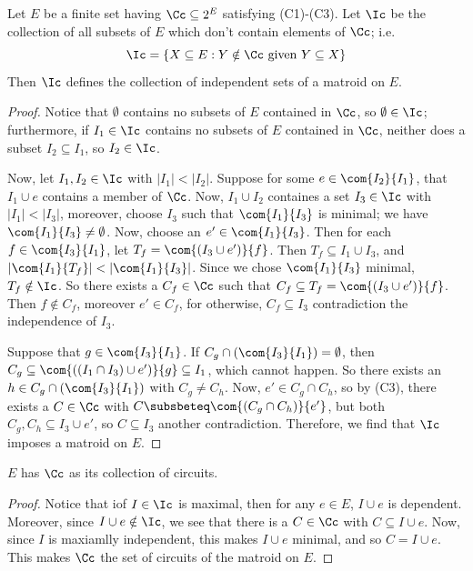 \begin{theorem}\label{1.1.2}
    Let $E$ be a finite set having  $\Cc \subseteq 2^E$ satisfying (C1)-(C3).
    Let $\Ic$ be the collection of all subsets of $E$ which don't contain
    elements of  $\Cc$; i.e.
    \begin{equation*}
        \Ic=\{X \subseteq E : Y \notin \Cc \text{ given } Y \subseteq X\}
    \end{equation*}
    Then $\Ic$ defines the collection of independent sets of a matroid on $E$.
\end{theorem}
\begin{proof}
    Notice that $\emptyset$ contains no subsets of  $E$ contained in  $\Cc$, so
     $\emptyset \in \Ic$; furthermore, if  $I_1 \in \Ic$ contains no subsets of
     $E$ contained in  $\Cc$, neither does a subset  $I_2 \subseteq I_1$, so
     $I_2 \in \Ic$.

     Now, let $I_1,I_2 \in \Ic$ with $|I_1|<|I_2|$. Suppose for some $e \in
     \com{I_2}{I_1}$, that $I_1 \cup e$ contains a member of $\Cc$. Now,  $I_1
     \cup I_2$ containes a set $I_3 \in \Ic$ with $|I_1|<|I_3|$, moreover,
     choose $I_3$ such that $\com{I_1}{I_3}$ is minimal; we have $\com{I_1}{I_3}
     \neq \emptyset$. Now, choose an $e' \in \com{I_1}{I_3}$. Then for each $f
     \in \com{{I_3}}{I_1}$, let $T_f=\com{(I_3 \cup e')}{f}$. Then $T_f
     \subseteq I_1 \cup I_3$, and $|\com{I_1}{T_f}|<|\com{I_1}{I_3}|$. Since we
     chose $\com{I_1}{I_3}$ minimal, $T_f \notin \Ic$. So there exists a $C_f
     \in \Cc$ such that  $C_f \subseteq T_f=\com{(I_3 \cup e')}{f}$. Then  $f
     \notin C_f$, moreover $e' \in C_f$, for otherwise,  $C_f \subseteq I_3$
     contradiction the independence of $I_3$.

     Suppose that $g \in \com{I_3}{I_1}$. If $C_g \cap (\com{I_3}{I_1})=
     \emptyset$, then $C_g \subseteq \com{((I_1 \cap I_3) \cup e')}{g} \subseteq
     I_1$, which cannot happen. So there exists an $h \in C_g \cap
     (\com{I_3}{I_1})$ with $C_g \neq C_h$. Now,  $e' \in C_g \cap C_h$, so by
     (C3), there exists a $C \in \Cc$ with  $C \subsbeteq \com{(C_g \cap C_h)}
     {e'}$, but both $C_g,C_h \subseteq I_3 \cup e'$, so $C \subseteq I_3$
     another contradiction. Therefore, we find that $\Ic$ imposes a matroid on
     $E$.
\end{proof}
\begin{corollary}
    $E$ has  $\Cc$ as its collection of circuits.
\end{corollary}
\begin{proof}
    Notice that iof $I \in \Ic$ is maximal, then for any $e \in E$,  $I \cup e$
    is  dependent. Moreover, since $I \cup e \notin \Ic$, we see that there is a
     $C \in \Cc$ with  $C \subseteq I \cup e$. Now, since  $I$ is maxiamlly
     independent, this makes  $I \cup e$ minimal, and so  $C = I \cup e$. This
     makes  $\Cc$ the set of circuits of the matroid on $E$.
\end{proof}

